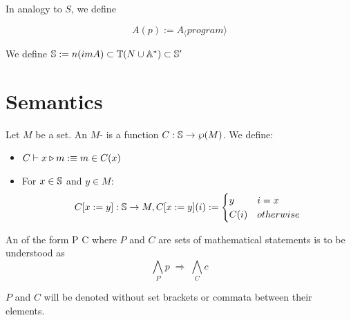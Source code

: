 In analogy to $S$, we define

\[A (p) := A_\langle program \rangle\]

We define $\mathbb{S} := n(im A) \subset\mathbb{T}(N \cup \mathbb{A}^\ast) \subset \mathbb{S}'$

\section{Semantics}\label{sec:semantics}

Let $M$ be a set.
An $M$- is a function $C: \mathbb{S} \rightarrow \wp (M)$. We define: 

\begin{itemize}
\item $C \vdash x \triangleright m :\equiv m \in C(x)$
\item For $x \in \mathbb{S}$ and $y \in M$:
\[C[x := y] : \mathbb{S} \rightarrow M, C[x := y](i) := \begin{cases} y & i = x \\ C(i) & otherwise\end {cases}\]
\end{itemize}

An  of the form \irule P C where $P$ and $C$ are sets of mathematical statements is to be understood as 
\[\bigwedge_P p \; \Rightarrow \; \bigwedge_C c\]

$P$ and $C$ will be denoted without set brackets or commata between their elements.